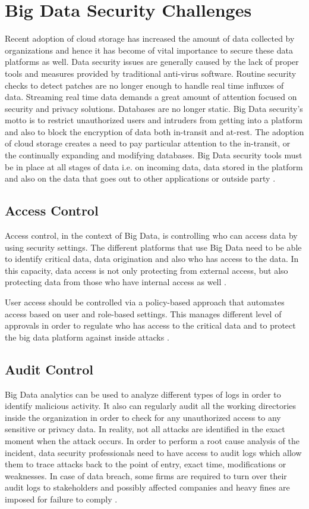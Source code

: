 \documentclass[sigconf]{acmart}
\begin{document}
\section{Big Data Security Challenges}
Recent adoption of cloud storage has increased the amount of data collected by organizations and hence it has become of vital importance to secure these data platforms as well. Data security issues are generally caused by the lack of proper tools and measures provided by traditional anti-virus software. Routine security checks to detect patches are no longer enough to handle real time influxes of data. Streaming real time data demands a great amount of attention focused on security and privacy solutions. Databases are no longer static. Big Data security's motto is to restrict unauthorized users and intruders from getting into a platform and also to block the encryption of data both in-transit and at-rest.  The adoption of cloud storage creates a need to pay particular attention to the in-transit, or the continually expanding and modifying databases. Big Data security tools must be in place at all stages of data i.e. on incoming data, data stored in the platform and also on the data that goes out to other applications or outside party \cite{datamation}.

\subsection{Access Control}
Access control, in the context of Big Data, is controlling who can access data by using security settings. The different platforms that use Big Data need to be able to identify critical data, data origination and also who has access to the data. In this capacity, data access is not only protecting from external access, but also protecting data from those who have internal access as well \cite{rahmaniamathematical}.

User access should be controlled via a policy-based approach that automates access based on user and role-based settings. This manages different level of approvals in order to regulate who has access to the critical data and to protect the big data platform against inside attacks \cite{dataconomy}.

\subsection{Audit Control}
Big Data analytics can be used to analyze different types of logs in order to identify malicious activity. It also can regularly audit all the working directories inside the organization in order to check for any unauthorized access to any sensitive or privacy data. In reality, not all attacks are identified in the exact moment when the attack occurs. In order to perform a root cause analysis of the incident, data security professionals need to have access to audit logs which allow them to trace attacks back to the point of entry, exact time, modifications or weaknesses. In case of data breach, some firms are required to turn over their audit logs to stakeholders and possibly affected companies and heavy fines are imposed for failure to comply \cite{csasecurity}. 
\end{document}

